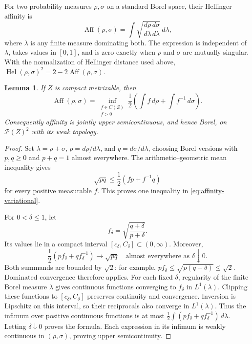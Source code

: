 \documentclass[11pt]{article}
\newtheorem{lemma}[theorem]{Lemma}
\theoremstyle{definition}
\newcommand{\Prob}{\mathcal P}
\newcommand{\Hel}{\operatorname{Hel}}
\newcommand{\Aff}{\operatorname{Aff}}
\begin{document}
For two probability measures $\rho,\sigma$ on a standard Borel space,
their Hellinger affinity is
\[
 \Aff(\rho,\sigma)
 =\int\sqrt{\frac{d\rho}{d\lambda}
                  \frac{d\sigma}{d\lambda}}\,d\lambda,
\]
where $\lambda$ is any finite measure dominating both. The expression
is independent of $\lambda$, takes values in $[0,1]$, and is zero
exactly when $\rho$ and $\sigma$ are mutually singular. With the
normalization of Hellinger distance used above,
$\Hel(\rho,\sigma)^2=2-2\Aff(\rho,\sigma)$.

\begin{lemma}\label{lem:affinity-usc}
If $Z$ is compact metrizable, then
\begin{equation}\label{eq:affinity-variational}
 \Aff(\rho,\sigma)
 =\inf_{\substack{f\in C(Z)\\ f>0}}
       \frac12\left(\int f\,d\rho+\int f^{-1}\,d\sigma\right).
\end{equation}
Consequently affinity is jointly upper semicontinuous, and hence
Borel, on $\Prob(Z)^2$ with its weak topology.
\end{lemma}

\begin{proof}
Set $\lambda=\rho+\sigma$, $p=d\rho/d\lambda$, and
$q=d\sigma/d\lambda$, choosing Borel versions with $p,q\geq0$ and
$p+q=1$ almost everywhere. The arithmetic--geometric mean inequality
gives
\[
 \sqrt{pq}\leq\frac12(fp+f^{-1}q)
\]
for every positive measurable $f$. This proves one inequality in
\eqref{eq:affinity-variational}.

For $0<\delta\leq1$, let
\[
 f_\delta=\sqrt{\frac{q+\delta}{p+\delta}}.
\]
Its values lie in a compact interval $[c_\delta,C_\delta]\subset(0,\infty)$.
Moreover,
\[
 \frac12(pf_\delta+qf_\delta^{-1})\longrightarrow\sqrt{pq}
 \quad\text{almost everywhere as }\delta\downarrow0.
\]
Both summands are bounded by $\sqrt2$: for example,
$pf_\delta\leq\sqrt{p(q+\delta)}\leq\sqrt2$.
Dominated convergence therefore applies. For each fixed $\delta$,
regularity of the finite Borel measure $\lambda$ gives continuous
functions converging to $f_\delta$ in $L^1(\lambda)$. Clipping these
functions to $[c_\delta,C_\delta]$ preserves continuity and convergence.
Inversion is Lipschitz on this interval, so their reciprocals also
converge in $L^1(\lambda)$. Thus the infimum over positive continuous
functions is at most
$\frac12\int(pf_\delta+qf_\delta^{-1})\,d\lambda$.
Letting $\delta\downarrow0$ proves the formula. Each expression in its
infimum is weakly continuous in $(\rho,\sigma)$, proving upper
semicontinuity.
\end{proof}
\end{document}
